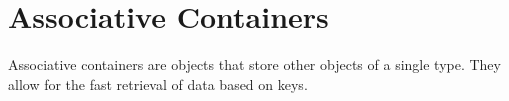 
\cleardoublepage
\chapter{Associative Containers}

Associative containers are objects that store other objects of a single type.
They allow for the fast retrieval of data based on keys.





\newpage


\newpage



